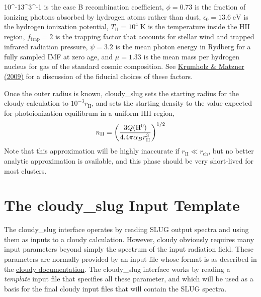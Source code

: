 \documentclass[letterpaper,10pt,english]{sphinxmanual}
\begin{document}
10^{-13}\;^3\;^{-1}\) is the case B recombination
coefficient, \(\phi = 0.73\) is the fraction of ionizing photons absorbed
by hydrogen atoms rather than dust, \(\epsilon_0 =
13.6\;\mathrm{eV}\) is the hydrogen ionization potential,
\(T_{\mathrm{II}} = 10^4\;\mathrm{K}\) is the temperature inside
the HII region, \(f_{\mathrm{trap}} = 2\) is the trapping factor
that accounts for stellar wind and trapped infrared radiation
pressure, \(\psi = 3.2\) is the mean photon energy in Rydberg for
a fully sampled IMF at zero age, and \(\mu = 1.33\) is the mean
mass per hydrogen nucleus for gas of the standard cosmic
composition. See \href{http://adsabs.harvard.edu/abs/2009ApJ...703.1352K}{Krumholz \& Matzner (2009)} for a discussion
of the fiducial choices of these factors.

Once the outer radius is known, cloudy\_slug sets the starting radius
for the cloudy calculation to \(10^{-3} r_{\mathrm{II}}\), and
sets the starting density to the value expected for photoionization
equilibrum in a uniform HII region,
\begin{gather}
\begin{split}n_{\mathrm{II}} = \left(\frac{3
Q(\mathrm{H}^0)}{4.4 \pi\alpha_B
r_{\mathrm{II}}^3}\right)^{1/2}\end{split}\notag
\end{gather}
Note that this approximation will be highly inaccurate if
\(r_{\mathrm{II}} \ll r_{\mathrm{ch}}\), but no better analytic
approximation is available, and this phase should be very short-lived
for most clusters.


\section{The cloudy\_slug Input Template}
\label{cloudy:the-cloudy-slug-input-template}\label{cloudy:ssec-cloudy-template}
The cloudy\_slug interface operates by reading SLUG output spectra and
using them as inputs to a cloudy calculation. However, cloudy
obviously requires many input parameters beyond simply the spectrum of
the input radiation field. These parameters are normally provided by
an input file whose format is as described in the \href{http://nublado.org}{cloudy documentation}. The cloudy\_slug interface works by reading a
\emph{template} input file that specifies all these parameter, and which
will be used as a basis for the final cloudy input files that will
contain the SLUG spectra.
\end{document}

